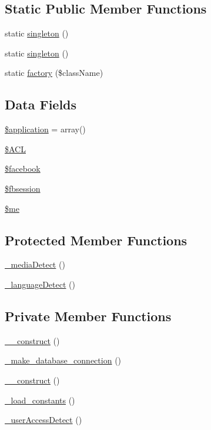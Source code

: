 \subsection*{Static Public Member Functions}
\begin{DoxyCompactItemize}
\item 
static \hyperlink{classImpact__Superclass_af527068985bac6010736b5959643eda7}{singleton} ()
\item 
static \hyperlink{classImpact__Superclass_af527068985bac6010736b5959643eda7}{singleton} ()
\item 
static \hyperlink{classImpact__Superclass_a8c0508f1ea0fe72c8d0e6e8dd2a1c41c}{factory} (\$className)
\end{DoxyCompactItemize}
\subsection*{Data Fields}
\begin{DoxyCompactItemize}
\item 
\hyperlink{classImpact__Superclass_a537fa9b460dddc2a67074faab810398a}{\$application} = array()
\item 
\hyperlink{classImpact__Superclass_a0e6e927aed984ad8947f77bf803b70bb}{\$ACL}
\item 
\hyperlink{classImpact__Superclass_a4b9bb5e9f7a5ea9381bdbe31c44e9339}{\$facebook}
\item 
\hyperlink{classImpact__Superclass_a92c4441a7b5fe8069992f5a4a29f24fe}{\$fbsession}
\item 
\hyperlink{classImpact__Superclass_ad856a60cee1894f180e845f9b7b81458}{\$me}
\end{DoxyCompactItemize}
\subsection*{Protected Member Functions}
\begin{DoxyCompactItemize}
\item 
\hyperlink{classImpact__Superclass_a36245233fa9d0fbb0a71e2a985e79c72}{\_\-mediaDetect} ()
\item 
\hyperlink{classImpact__Superclass_a06e0d9a42275d91e76f877af01c9b0de}{\_\-languageDetect} ()
\end{DoxyCompactItemize}
\subsection*{Private Member Functions}
\begin{DoxyCompactItemize}
\item 
\hyperlink{classImpact__Superclass_a095c5d389db211932136b53f25f39685}{\_\-\_\-construct} ()
\item 
\hyperlink{classImpact__Superclass_a16870e7c667f514a099afacc1009252b}{\_\-make\_\-database\_\-connection} ()
\item 
\hyperlink{classImpact__Superclass_a095c5d389db211932136b53f25f39685}{\_\-\_\-construct} ()
\item 
\hyperlink{classImpact__Superclass_a2c7019c3058ec100b498ed14dd2c4d23}{\_\-load\_\-constants} ()
\item 
\hyperlink{classImpact__Superclass_a6e7a5edea355b304f86d731e4d57dc84}{\_\-userAccessDetect} ()
\end{DoxyCompactItemize}
